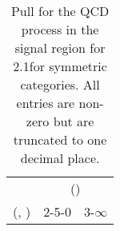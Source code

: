 \begin{table}[h!]
\tiny
\centering
\caption{Pull for the QCD process in the signal region for 2.1\ifb for symmetric categories. All entries are non-zero but are truncated to one decimal place.\label{tab:pullsep_sig_qcd_sym}}
\begin{tabular}
{ccc}
	\hline\hline
	& \multicolumn{2}{c}{\scalht (\gev)} \\ 
	 (\njet,  \nb) & 2-5-0 & 3-$\infty$ \\ [0.8ex] 
\hline
	\hline
	\hline
\end{tabular}
\end{table}
